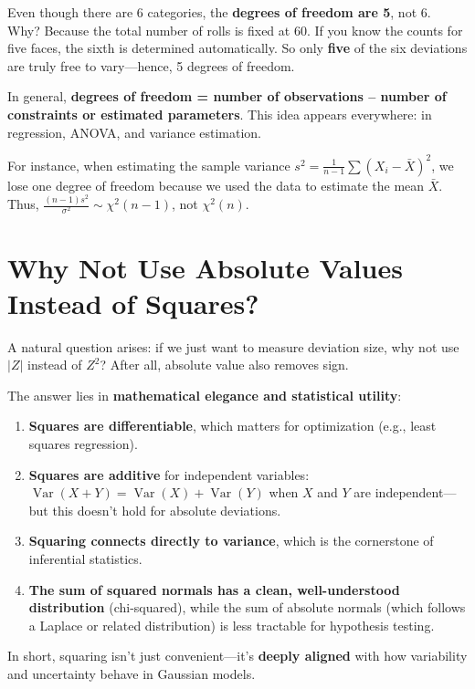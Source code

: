 \documentclass[12pt]{article}
\begin{document}
Even though there are 6 categories, the \textbf{degrees of freedom are 5}, not 6. Why? Because the total number of rolls is fixed at 60. If you know the counts for five faces, the sixth is determined automatically. So only \textbf{five} of the six deviations are truly free to vary—hence, 5 degrees of freedom.

In general, \textbf{degrees of freedom = number of observations – number of constraints or estimated parameters}. This idea appears everywhere: in regression, ANOVA, and variance estimation.

For instance, when estimating the sample variance $s^2 = \frac{1}{n-1} \sum (X_i - \bar{X})^2$, we lose one degree of freedom because we used the data to estimate the mean $\bar{X}$. Thus, $\frac{(n-1)s^2}{\sigma^2} \sim \chi^2(n-1)$, not $\chi^2(n)$.

\section*{Why Not Use Absolute Values Instead of Squares?}

A natural question arises: if we just want to measure deviation size, why not use $|Z|$ instead of $Z^2$? After all, absolute value also removes sign.

The answer lies in \textbf{mathematical elegance and statistical utility}:

\begin{enumerate}
    \item \textbf{Squares are differentiable}, which matters for optimization (e.g., least squares regression).
    \item \textbf{Squares are additive} for independent variables: $\operatorname{Var}(X + Y) = \operatorname{Var}(X) + \operatorname{Var}(Y)$ when $X$ and $Y$ are independent—but this doesn’t hold for absolute deviations.
    \item \textbf{Squaring connects directly to variance}, which is the cornerstone of inferential statistics.
    \item \textbf{The sum of squared normals has a clean, well-understood distribution} (chi-squared), while the sum of absolute normals (which follows a Laplace or related distribution) is less tractable for hypothesis testing.
\end{enumerate}

In short, squaring isn’t just convenient—it’s \textbf{deeply aligned} with how variability and uncertainty behave in Gaussian models.
\end{document}
